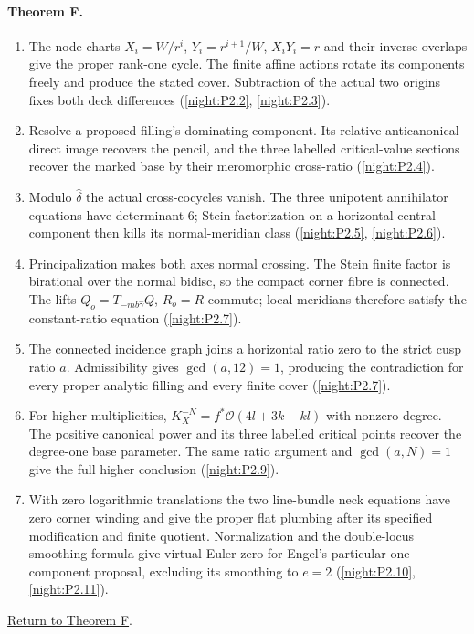 \documentclass[11pt,a4paper]{article}
\theoremstyle{definition}
\begin{document}
\hypertarget{outline-I-F}{}
\paragraph{Theorem F.}
\begin{enumerate}[label=\arabic*.]
\item\hypertarget{step-I-F-1}{} The node charts
$X_i=W/r^i$, $Y_i=r^{i+1}/W$, $X_iY_i=r$ and their inverse
overlaps give the proper rank-one cycle.  The finite affine
actions rotate its components freely and produce the stated
cover.  Subtraction of the actual two origins fixes both deck
differences
(\hyperref[night:P2.2]{\ref*{night:P2.2}},
\hyperref[night:P2.3]{\ref*{night:P2.3}}).
\item\hypertarget{step-I-F-2}{} Resolve a proposed filling's
dominating component.  Its relative anticanonical direct image
recovers the pencil, and the three labelled critical-value
sections recover the marked base by their meromorphic cross-ratio
(\hyperref[night:P2.4]{\ref*{night:P2.4}}).
\item\hypertarget{step-I-F-3}{} Modulo $\widehat\delta$ the
actual cross-cocycles vanish.  The three unipotent annihilator
equations have determinant 6; Stein factorization on a horizontal
central component then kills its normal-meridian class
(\hyperref[night:P2.5]{\ref*{night:P2.5}},
\hyperref[night:P2.6]{\ref*{night:P2.6}}).
\item\hypertarget{step-I-F-4}{} Principalization makes both
axes normal crossing.  The Stein finite factor is birational
over the normal bidisc, so the compact corner fibre is connected.
The lifts $Q_o=T_{-mb\widehat\gamma}Q$, $R_o=R$ commute;
local meridians therefore satisfy the constant-ratio equation
(\hyperref[night:P2.7]{\ref*{night:P2.7}}).
\item\hypertarget{step-I-F-5}{} The connected incidence graph
joins a horizontal ratio zero to the strict cusp ratio $a$.
Admissibility gives $\gcd(a,12)=1$, producing the contradiction
for every proper analytic filling and every finite cover
(\hyperref[night:P2.7]{\ref*{night:P2.7}}).
\item\hypertarget{step-I-F-6}{} For higher multiplicities,
$K_X^{-N}=f^*\mathcal O(4l+3k-kl)$ with nonzero degree.
The positive canonical power and its three labelled critical
points recover the degree-one base parameter.  The same ratio
argument and $\gcd(a,N)=1$ give the full higher conclusion
(\hyperref[night:P2.9]{\ref*{night:P2.9}}).
\item\hypertarget{step-I-F-7}{} With zero logarithmic
translations the two line-bundle neck equations have zero
corner winding and give the proper flat plumbing after its
specified modification and finite quotient.  Normalization and
the double-locus smoothing formula give virtual Euler zero for
Engel's particular one-component proposal, excluding its
smoothing to $e=2$
(\hyperref[night:P2.10]{\ref*{night:P2.10}},
\hyperref[night:P2.11]{\ref*{night:P2.11}}).
\end{enumerate}
\hyperlink{main-I-F}{Return to Theorem F}.
\end{document}

